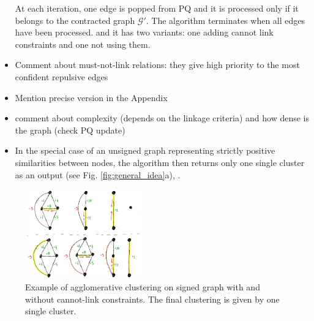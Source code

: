 \begin{itemize}
At each iteration, one edge is popped from PQ and it is processed only if it belongs to the contracted graph $\mathcal{G}'$. The algorithm terminates when all edges have been processed. and it has two variants: one adding cannot link constraints and one not using them.
\item Comment about must-not-link relations: they give high priority to the most confident repulsive edges 
\item Mention precise version in the Appendix
\item comment about complexity (depends on the linkage criteria) and how dense is the graph (check PQ update)


\item In the special case of an unsigned graph %
 representing strictly positive similarities between nodes, the algorithm then returns only one single cluster as an output (see Fig. \ref{fig:general_idea}a), .

\end{itemize}


\begin{figure}
\centering
\includegraphics[width=0.45\textwidth,trim=0.in 0.in 0.in 0.in,clip]{./figs/cannot-lin-constraints.png}
\caption{\small 
Example of agglomerative clustering on signed graph with and without cannot-link constraints. The final clustering is given by one single cluster.
\label{fig:example_cannot_link_constraints}}
\end{figure}


